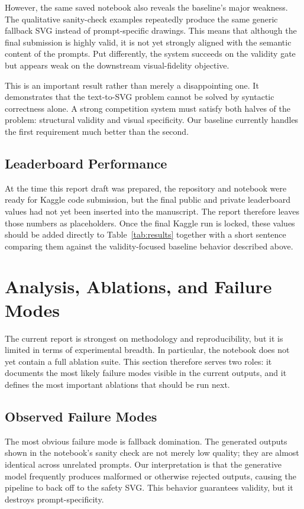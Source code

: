 \documentclass[11pt]{article}
\begin{document}
However, the same saved notebook also reveals the baseline's major weakness. The qualitative sanity-check examples repeatedly produce the same generic fallback SVG instead of prompt-specific drawings. This means that although the final submission is highly valid, it is not yet strongly aligned with the semantic content of the prompts. Put differently, the system succeeds on the validity gate but appears weak on the downstream visual-fidelity objective.

This is an important result rather than merely a disappointing one. It demonstrates that the text-to-SVG problem cannot be solved by syntactic correctness alone. A strong competition system must satisfy both halves of the problem: structural validity and visual specificity. Our baseline currently handles the first requirement much better than the second.

\subsection{Leaderboard Performance}
At the time this report draft was prepared, the repository and notebook were ready for Kaggle code submission, but the final public and private leaderboard values had not yet been inserted into the manuscript. The report therefore leaves those numbers as placeholders. Once the final Kaggle run is locked, these values should be added directly to Table~\ref{tab:results} together with a short sentence comparing them against the validity-focused baseline behavior described above.

\section{Analysis, Ablations, and Failure Modes}
The current report is strongest on methodology and reproducibility, but it is limited in terms of experimental breadth. In particular, the notebook does not yet contain a full ablation suite. This section therefore serves two roles: it documents the most likely failure modes visible in the current outputs, and it defines the most important ablations that should be run next.

\subsection{Observed Failure Modes}
The most obvious failure mode is fallback domination. The generated outputs shown in the notebook's sanity check are not merely low quality; they are almost identical across unrelated prompts. Our interpretation is that the generative model frequently produces malformed or otherwise rejected outputs, causing the pipeline to back off to the safety SVG. This behavior guarantees validity, but it destroys prompt-specificity.
\end{document}
